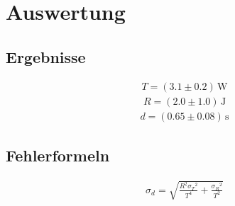 \documentclass[a4paper,10pt]{scrbook}
\begin{document}
\section*{Auswertung}

\subsection*{Ergebnisse}

\begin{align*}T = (3.1\pm 0.2)\,\mathrm{W}\end{align*}\begin{align*}R = (2.0\pm 1.0)\,\mathrm{J}\end{align*}\begin{align*}d = (0.65\pm 0.08)\,\mathrm{s}\end{align*}

\subsection*{Fehlerformeln}

\begin{align*}\sigma_{d}=\sqrt{\frac{R^{2} {\sigma_{{T}}}^{2}}{T^{4}} + \frac{{\sigma_{{R}}}^{2}}{T^{2}}}\end{align*}
\end{document}
